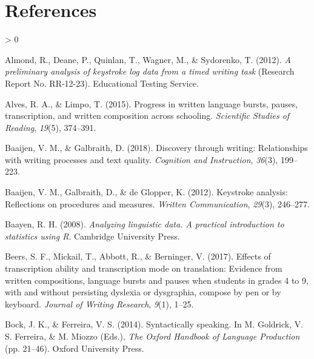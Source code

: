 \documentclass[
  english,
  man,mask,floatsintext]{apa7}
\newlength{\cslhangindent}
\newenvironment{CSLReferences}[2] %
 {%
  \setlength{\parindent}{0pt}
  \ifodd #1 \everypar{\setlength{\hangindent}{\cslhangindent}}\ignorespaces\fi
  \ifnum #2 > 0
  \setlength{\parskip}{#2\baselineskip}
  \fi
 }%
 {}
\begin{document}
\hypertarget{references}{%
\section{References}\label{references}}

\begingroup
\setlength{\parindent}{-0.5in}
\setlength{\leftskip}{0.5in}

\hypertarget{ref}{}

\endgroup

\hypertarget{refs}{}
\begin{CSLReferences}{1}{0}
\leavevmode\hypertarget{ref-almond2012preliminary}{}%
Almond, R., Deane, P., Quinlan, T., Wagner, M., \& Sydorenko, T. (2012). \emph{A preliminary analysis of keystroke log data from a timed writing task} (Research Report No. RR-12-23). Educational Testing Service.

\leavevmode\hypertarget{ref-alves2015progress}{}%
Alves, R. A., \& Limpo, T. (2015). Progress in written language bursts, pauses, transcription, and written composition across schooling. \emph{Scientific Studies of Reading}, \emph{19}(5), 374--391.

\leavevmode\hypertarget{ref-baaijen2018discovery}{}%
Baaijen, V. M., \& Galbraith, D. (2018). Discovery through writing: Relationships with writing processes and text quality. \emph{Cognition and Instruction}, \emph{36}(3), 199--223.

\leavevmode\hypertarget{ref-baaijen2012keystroke}{}%
Baaijen, V. M., Galbraith, D., \& de Glopper, K. (2012). Keystroke analysis: Reflections on procedures and measures. \emph{Written Communication}, \emph{29}(3), 246--277.

\leavevmode\hypertarget{ref-baa08book}{}%
Baayen, R. H. (2008). \emph{Analyzing linguistic data. {A} practical introduction to statistics using {R}}. Cambridge University Press.

\leavevmode\hypertarget{ref-beers2017effects}{}%
Beers, S. F., Mickail, T., Abbott, R., \& Berninger, V. (2017). Effects of transcription ability and transcription mode on translation: Evidence from written compositions, language bursts and pauses when students in grades 4 to 9, with and without persisting dyslexia or dysgraphia, compose by pen or by keyboard. \emph{Journal of Writing Research}, \emph{9}(1), 1--25.

\leavevmode\hypertarget{ref-bock2014syntactically}{}%
Bock, J. K., \& Ferreira, V. S. (2014). Syntactically speaking. In M. Goldrick, V. S. Ferreira, \& M. Miozzo (Eds.), \emph{{The Oxford Handbook of Language Production}} (pp. 21--46). Oxford University Press.


\end{CSLReferences}
\end{document}
